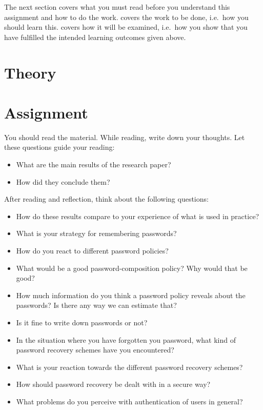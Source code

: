The next section covers what you must read before you understand this 
assignment and how to do the work.
 covers the work to be done, i.e.~how you should learn this.
 covers how it will be examined, i.e.~how you show that you have 
fulfilled the intended learning outcomes given above.


\section{Theory}
\label{sec:theory}



\section{Assignment}
\label{sec:tasks}
You should read the material.
While reading, write down your thoughts.
Let these questions guide your reading:
\begin{itemize}
  \item What are the main results of the research paper?
  \item How did they conclude them?
\end{itemize}

After reading and reflection, think about the following questions:
\begin{itemize}
  \item How do these results compare to your experience of what is used in 
    practice?
  \item What is your strategy for remembering passwords?
  \item How do you react to different password policies?
  \item What would be a good password-composition policy?
    Why would that be good?
  \item How much information do you think a password policy reveals about the 
    passwords?
    Is there any way we can estimate that?
  \item Is it fine to write down passwords or not?
  \item In the situation where you have forgotten you password,
  	what kind of password recovery schemes have you encountered?
  \item What is your reaction towards the different password recovery schemes?  
  \item How should password recovery be dealt with in a secure way?
  \item What problems do you perceive with authentication of users in general?
\end{itemize}

